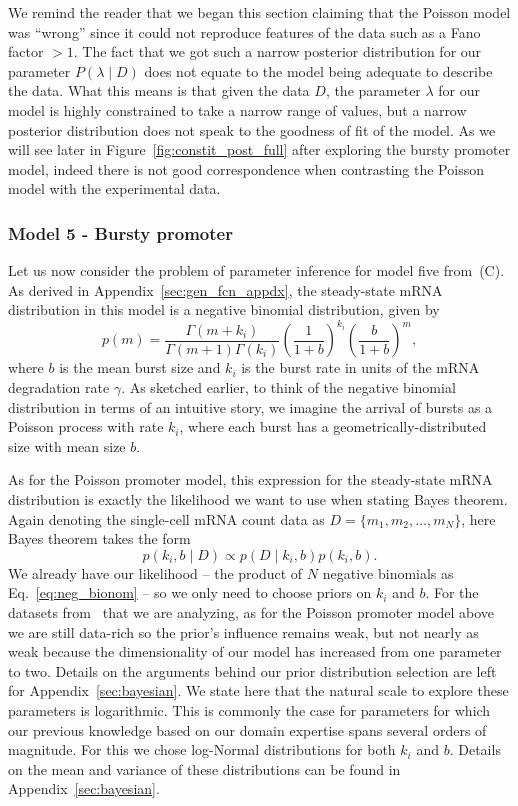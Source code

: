 We remind the reader that we began this section claiming that the Poisson model
was ``wrong'' since it could not reproduce features of the data such as a Fano
factor $> 1$. The fact that we got such a narrow posterior distribution for our
parameter $P(\lambda \mid D)$ does not equate to the model being adequate to
describe the data. What this means is that given the data $D$, the parameter 
$\lambda$ for our model is highly constrained to take a narrow range of values,
but a narrow posterior distribution does not speak to the goodness of fit of the
model. As we will see later in Figure~\ref{fig:constit_post_full} after
exploring the bursty promoter model, indeed there is not good correspondence
when contrasting the Poisson model with the experimental data.

\subsubsection{Model 5 - Bursty promoter}

Let us now consider the problem of parameter inference for model five
from~(C). As derived in
Appendix~\ref{sec:gen_fcn_appdx}, the steady-state mRNA distribution in this
model is a negative binomial distribution, given by
\begin{equation}
p(m) = \frac{\Gamma(m+k_i)}{\Gamma(m+1)\Gamma(k_i)}
        \left(\frac{1}{1+b}\right)^{k_i}
        \left(\frac{b}{1+b}\right)^m,
\label{eq:neg_bionom}
\end{equation}
where $b$ is the mean burst size and $k_i$ is the burst rate in units of the
mRNA degradation rate $\gamma$. As sketched earlier, to think of the negative
binomial distribution in terms of an intuitive story, we imagine the arrival of
bursts as a Poisson process with rate $k_i$, where each burst has a 
geometrically-distributed size with mean size $b$.

As for the Poisson promoter model, this expression for the steady-state mRNA
distribution is exactly the likelihood we want to use when stating Bayes
theorem. Again denoting the single-cell mRNA count data as $D=\{m_1, m_2,\dots,
m_N\}$, here Bayes theorem takes the form
\begin{equation}
p(k_i, b \mid D) \propto p(D\mid k_i,b)p(k_i, b).
\end{equation}
We already have our likelihood -- the product of $N$ negative binomials as
Eq.~\ref{eq:neg_bionom} -- so we only need to choose priors on $k_i$ and $b$.
For the datasets from~\cite{Jones2014} that we are analyzing, as for the Poisson
promoter model above we are still data-rich so the prior's influence remains
weak, but not nearly as weak because the dimensionality of our model has
increased from one parameter to two. Details on the arguments behind our prior
distribution selection are left for Appendix~\ref{sec:bayesian}. We state here
that the natural scale to explore these parameters is logarithmic. This is
commonly the case for parameters for which our previous knowledge based on our
domain expertise spans several orders of magnitude. For this we chose log-Normal
distributions for both $k_i$ and $b$. Details on the mean and variance of these
distributions can be found in Appendix~\ref{sec:bayesian}.

